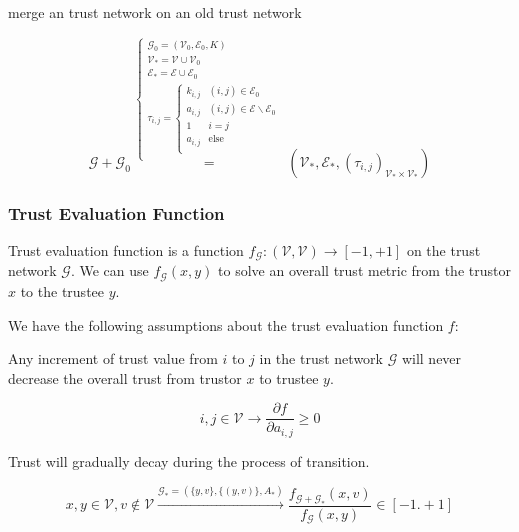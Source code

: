 \documentclass{article}
\begin{document}
merge an trust network on an old trust network

\begin{equation}
\mathcal{G}+\mathcal{G}_0\overset{\left\{
\begin{array}{c}
 \mathcal{G}_0=\left(\mathcal{V}_0,\mathcal{E}_0,K\right) \\
 \mathcal{V}_*=\mathcal{V}\cup \mathcal{V}_0 \\
 \mathcal{E}_*=\mathcal{E}\cup \mathcal{E}_0 \\
 \tau _{i,j}=\left\{
\begin{array}{cc}
 k_{i,j} & (i,j)\in \mathcal{E}_0 \\
 a_{i,j} & (i,j)\in \mathcal{E}\backslash \mathcal{E}_0 \\
 1 & i=j \\
 a_{i,j} & \text{else} \\
\end{array}
\right. \\
\end{array}
\right.}{=}\left(\mathcal{V}_*,\mathcal{E}_*,\left(\tau _{i,j}\right)_{\mathcal{V}_*\times \mathcal{V}_*}\right)
\end{equation}


\subsubsection{Trust Evaluation Function}

Trust evaluation function is a function \(f_{\mathcal{G}}:(\mathcal{V},\mathcal{V})\to [-1,+1]\) on the trust network \(\mathcal{G}\). We can use
\(f_{\mathcal{G}}(x,y)\) to solve an overall trust metric from the trustor \(x\) to the trustee \(y\).

We have the following assumptions about the trust evaluation function \(f\):

Any increment of trust value from \(i\) to \(j\) in the trust network \(\mathcal{G}\) will never decrease the overall trust from trustor \(x\) to
trustee \(y\).

\begin{equation}
i,j\in \mathcal{V}\to \frac{\partial f}{\partial a_{i,j}}\geq 0
\end{equation}

Trust will gradually decay during the process of transition.

\begin{equation}
x,y\in \mathcal{V},v\notin \mathcal{V}\overset{\mathcal{G}_*=\left(\{y,v\},\{(y,v)\},A_*\right)}{\to }\frac{f_{\mathcal{G}+\mathcal{G}_*}(x,v)}{f_{\mathcal{G}}(x,y)}\in
[-1.+1]
\end{equation}
\end{document}
